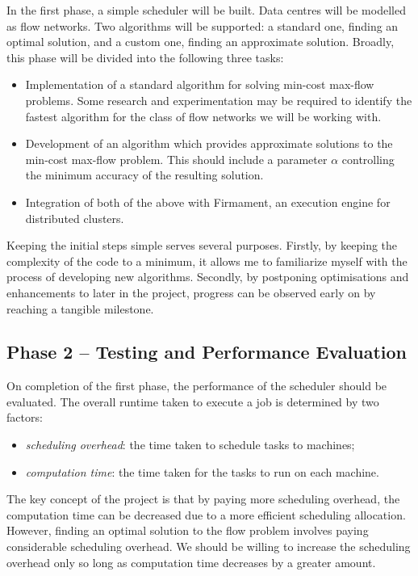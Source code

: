 In the first phase, a simple scheduler will be built. Data centres will be modelled as flow networks. Two algorithms will be supported: a standard one, finding an optimal solution, and a custom one, finding an approximate solution. Broadly, this phase will be divided into the following three tasks:
\begin{itemize}
  \item Implementation of a standard algorithm for solving min-cost max-flow problems. Some research and experimentation may be required to identify the fastest algorithm for the class of flow networks we will be working with.
  \item Development of an algorithm which provides approximate solutions to the min-cost max-flow problem. This should include a parameter $\alpha$ controlling the minimum accuracy of the resulting solution.
  \item Integration of both of the above with Firmament, an execution engine for distributed clusters.
\end{itemize}

Keeping the initial steps simple serves several purposes. Firstly, by keeping the complexity of the code to a minimum, it allows me to familiarize myself with the process of developing new algorithms. Secondly, by postponing optimisations and enhancements to later in the project, progress can be observed early on by reaching a tangible milestone.

\subsection*{Phase 2 -- Testing and Performance Evaluation}
\label{subsec:structure-phase2}


On completion of the first phase, the performance of the scheduler should be evaluated. The overall runtime taken to execute a job is determined by two factors:

\begin{itemize}
  \item \emph{scheduling overhead}: the time taken to schedule tasks to machines;
  \item \emph{computation time}: the time taken for the tasks to run on each machine.
\end{itemize}

The key concept of the project is that by paying more scheduling overhead, the computation time can be decreased due to a more efficient scheduling allocation. However, finding an optimal solution to the flow problem involves paying considerable scheduling overhead. We should be willing to increase the scheduling overhead only so long as computation time decreases by a greater amount.

